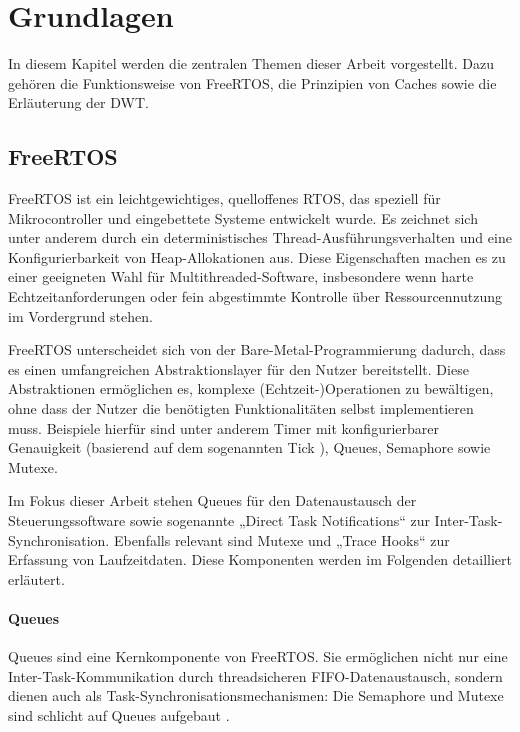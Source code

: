 \section{Grundlagen}

In diesem Kapitel werden die zentralen Themen dieser Arbeit vorgestellt. Dazu
gehören die Funktionsweise von FreeRTOS, die Prinzipien von Caches sowie die
Erläuterung der \ac{DWT}.

\subsection{FreeRTOS}

FreeRTOS ist ein leichtgewichtiges, quelloffenes RTOS, das speziell für
Mikrocontroller und eingebettete Systeme entwickelt wurde. Es zeichnet sich
unter anderem durch ein deterministisches Thread-Ausführungsverhalten und eine
Konfigurierbarkeit von Heap-Allokationen aus. Diese Eigenschaften machen es zu
einer geeigneten Wahl für Multithreaded-Software, insbesondere wenn harte
Echtzeitanforderungen \cite{freertos_tutorial} oder fein abgestimmte Kontrolle
über Ressourcennutzung im Vordergrund stehen.

FreeRTOS unterscheidet sich von der Bare-Metal-Programmierung dadurch, dass es
einen umfangreichen Abstraktionslayer für den Nutzer bereitstellt. Diese
Abstraktionen ermöglichen es, komplexe (Echtzeit-)Operationen zu bewältigen,
ohne dass der Nutzer die benötigten Funktionalitäten selbst implementieren muss.
Beispiele hierfür sind unter anderem Timer mit konfigurierbarer Genauigkeit
(basierend auf dem sogenannten Tick \cite{freertos_rtos_tick}), Queues,
Semaphore sowie Mutexe.

Im Fokus dieser Arbeit stehen Queues für den Datenaustausch der
Steuerungssoftware sowie sogenannte „Direct Task Notifications“ zur
Inter-Task-Synchronisation. Ebenfalls relevant sind Mutexe und „Trace Hooks“ zur
Erfassung von Laufzeitdaten. Diese Komponenten werden im Folgenden detailliert
erläutert.

\paragraph{Queues}

Queues sind eine Kernkomponente von FreeRTOS. Sie ermöglichen nicht nur eine
Inter-Task-Kommunikation durch threadsicheren FIFO-Datenaustausch, sondern
dienen auch als Task-Synchronisationsmechanismen: Die Semaphore und Mutexe sind
schlicht auf Queues aufgebaut \cite{freertos_semphr_incl, freertos_queue_mtx}.

